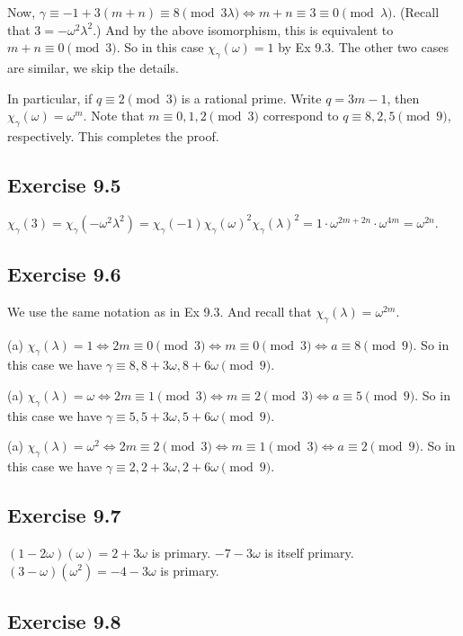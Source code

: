 \documentclass[../I&R.tex]{subfiles}
\begin{document}
Now, $\gamma\equiv-1+3(m+n)\equiv8\pmod{3\lambda} \iff m+n\equiv3\equiv0\pmod{\lambda}$. (Recall that $3=-\omega^2\lambda^2$.) And by the above isomorphism, this is equivalent to $m+n\equiv0\pmod{3}$. So in this case $\chi_\gamma(\omega)=1$ by Ex 9.3. The other two cases are similar, we skip the details.

In particular, if $q\equiv2\pmod{3}$ is a rational prime. Write $q=3m-1$, then $\chi_\gamma(\omega)=\omega^m$. Note that $m\equiv0,1,2\pmod{3}$ correspond to $q\equiv8,2,5\pmod{9}$, respectively. This completes the proof.

\subsection*{Exercise 9.5}

$\chi_\gamma(3)=\chi_\gamma(-\omega^2\lambda^2)=\chi_\gamma(-1)\chi_\gamma(\omega)^2\chi_\gamma(\lambda)^2=1\cdot\omega^{2m+2n}\cdot\omega^{4m}=\omega^{2n}$.

\subsection*{Exercise 9.6}

We use the same notation as in Ex 9.3. And recall that $\chi_\gamma(\lambda)=\omega^{2m}$.

(a) $\chi_\gamma(\lambda)=1 \iff 2m\equiv0\pmod{3} \iff m\equiv0\pmod{3} \iff a\equiv8\pmod{9}$. So in this case we have $\gamma\equiv8,8+3\omega,8+6\omega\pmod{9}$.

(a) $\chi_\gamma(\lambda)=\omega \iff 2m\equiv1\pmod{3} \iff m\equiv2\pmod{3} \iff a\equiv5\pmod{9}$. So in this case we have $\gamma\equiv5,5+3\omega,5+6\omega\pmod{9}$.

(a) $\chi_\gamma(\lambda)=\omega^2 \iff 2m\equiv2\pmod{3} \iff m\equiv1\pmod{3} \iff a\equiv2\pmod{9}$. So in this case we have $\gamma\equiv2,2+3\omega,2+6\omega\pmod{9}$.

\subsection*{Exercise 9.7}

$(1-2\omega)(\omega)=2+3\omega$ is primary. $-7-3\omega$ is itself primary. $(3-\omega)(\omega^2)=-4-3\omega$ is primary.

\subsection*{Exercise 9.8}
\end{document}
